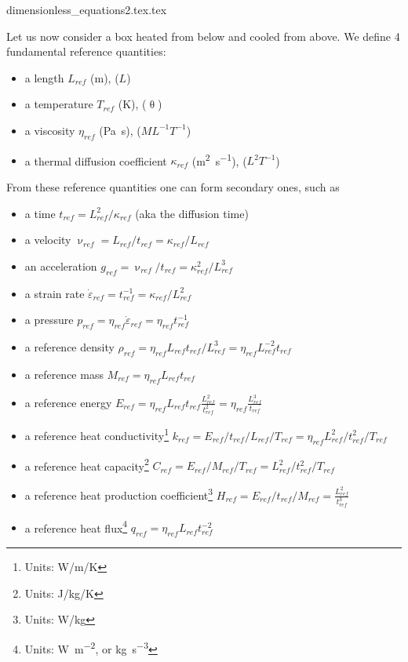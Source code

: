\begin{flushright} {\tiny {\color{gray} dimensionless\_equations2.tex.tex}} \end{flushright}

Let us now consider a box heated from below and cooled from above. 
We define 4 fundamental reference quantities:
\begin{itemize}
\item a length $L_{ref}$ (\si{\metre}), ($L$)
\item a temperature $T_{ref}$ (\si{\kelvin}), ($\uptheta$)
\item a viscosity $\eta_{ref}$ (\si{\pascal\second}), ($ML^{-1}T^{-1}$)
\item a thermal diffusion coefficient $\kappa_{ref}$ (\si{\square\metre\per\second}), ($L^2T^{-1}$)
\end{itemize}
From these reference quantities one can form secondary ones, such as
\begin{itemize}
\item a time $t_{ref} = L_{ref}^2 / \kappa_{ref}$ (aka the diffusion time)
\item a velocity $\upnu_{ref} = L_{ref} / t_{ref} = \kappa_{ref}/L_{ref}$
\item an acceleration $g_{ref} = \upnu_{ref} / t_{ref} = \kappa_{ref}^2/L_{ref}^3$
\item a strain rate $\dot{\varepsilon}_{ref} = t_{ref}^{-1} = \kappa_{ref} / L_{ref}^2$
\item a pressure $p_{ref} = \eta_{ref} \dot{\varepsilon}_{ref} = \eta_{ref} t_{ref}^{-1}$
\item a reference density $\rho_{ref} = \eta_{ref} L_{ref} t_{ref}/L_{ref}^3 = \eta_{ref} L_{ref}^{-2} t_{ref}$
\item a reference mass $M_{ref} = \eta_{ref} L_{ref} t_{ref}$
\item a reference energy $E_{ref} = \eta_{ref} L_{ref} t_{ref} \frac{L_{ref}^2}{t_{ref}^2} 
= \eta_{ref} \frac{L_{ref}^3}{t_{ref}}$
\item a reference heat conductivity\footnote{Units: W/m/K} $k_{ref}= E_{ref}/t_{ref}/L_{ref}/T_{ref}
= \eta_{ref} L_{ref}^2/t_{ref}^2/T_{ref}$
\item a reference heat capacity\footnote{Units: J/kg/K} 
$C_{ref}=E_{ref}/M_{ref}/T_{ref} = L_{ref}^2 /t_{ref}^2/T_{ref} $
\item a reference heat production coefficient\footnote{Units: W/kg}
$H_{ref}= E_{ref}/t_{ref}/M_{ref} = \frac{L_{ref}^2}{t_{ref}^3}$
\item a reference heat flux\footnote{Units: \si{\watt\per\square\meter}, or \si{\kg\per\cubic\second}} 
$q_{ref}= \eta_{ref} L_{ref} t_{ref}^{-2}$
\end{itemize}
